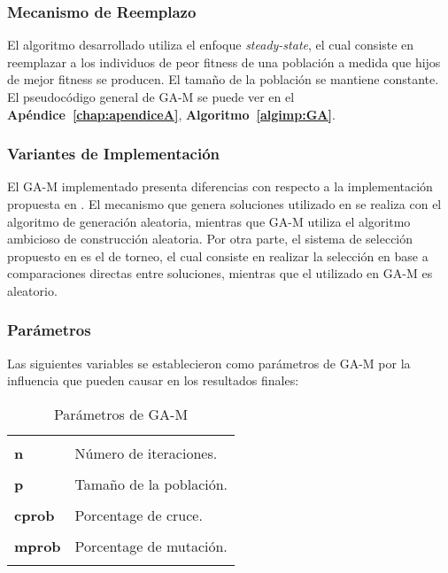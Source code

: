 \subsubsection*{Mecanismo de Reemplazo}

	El algoritmo desarrollado utiliza el enfoque \textit{steady-state}, el cual consiste en reemplazar a los individuos de peor fitness de una población a medida que hijos de mejor fitness se producen. El tamaño de la población se mantiene constante.\\

El pseudocódigo general de GA-M se puede ver en el \textbf{Apéndice~\ref{chap:apendiceA}}, \textbf{Algoritmo~\ref{algimp:GA}}.


\subsubsection*{Variantes de Implementación}

 El GA-M implementado presenta diferencias con respecto a la implementación propuesta en \cite{IGAimp}. El mecanismo que genera soluciones utilizado en \cite{IGAimp} se realiza con el algoritmo de generación aleatoria, mientras que GA-M  utiliza el algoritmo ambicioso de construcción aleatoria. Por otra parte, el sistema de selecci\'{o}n propuesto en \cite{IGAimp} es el de torneo, el cual consiste en realizar la selección en base a comparaciones directas entre soluciones, mientras que el utilizado en GA-M es aleatorio. 
 
\subsubsection*{Parámetros}

Las siguientes variables se establecieron como parámetros de GA-M por la influencia que pueden causar en los resultados finales:

\begin{table}[ht]
\centering
\small
\caption{Parámetros de GA-M}
\begin{tabular}{l||p{15cm}}
\hline\hline\\
\textbf{n} & Número de iteraciones.\\ 
[0.7ex]\cline{2-2}\\
\textbf{p} & Tamaño de la población.\\ 
[0.7ex]\cline{2-2}\\
\textbf{cprob} & Porcentage de cruce.\\
[0.7ex]\cline{2-2}\\
\textbf{mprob} & Porcentage de mutación.\\
\\ \hline\hline
\end{tabular}
\label{table:param-ga}
\end{table}


